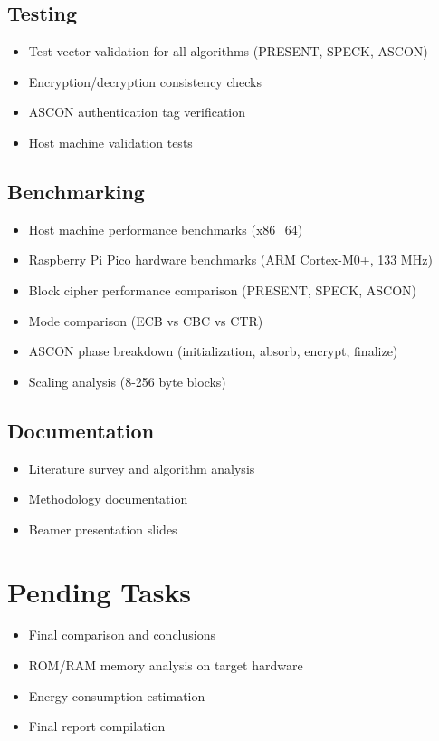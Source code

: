 \documentclass[12pt]{report}
\begin{document}
\subsection{Testing}
\begin{itemize}
    \item Test vector validation for all algorithms (PRESENT, SPECK, ASCON)
    \item Encryption/decryption consistency checks
    \item ASCON authentication tag verification
    \item Host machine validation tests
\end{itemize}

\subsection{Benchmarking}
\begin{itemize}
    \item Host machine performance benchmarks (x86\_64)
    \item Raspberry Pi Pico hardware benchmarks (ARM Cortex-M0+, 133 MHz)
    \item Block cipher performance comparison (PRESENT, SPECK, ASCON)
    \item Mode comparison (ECB vs CBC vs CTR)
    \item ASCON phase breakdown (initialization, absorb, encrypt, finalize)
    \item Scaling analysis (8-256 byte blocks)
\end{itemize}

\subsection{Documentation}
\begin{itemize}
    \item Literature survey and algorithm analysis
    \item Methodology documentation
    \item Beamer presentation slides
\end{itemize}

\section{Pending Tasks}

\begin{itemize}
    \item Final comparison and conclusions
    \item ROM/RAM memory analysis on target hardware
    \item Energy consumption estimation
    \item Final report compilation
\end{itemize}
\end{document}
